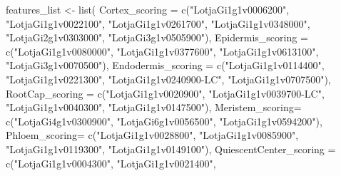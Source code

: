 \documentclass[
  letterpaper,
  DIV=11,
  numbers=noendperiod]{scrartcl}
\newenvironment{Shaded}{}{}
\newcommand{\FunctionTok}[1]{\textcolor[rgb]{0.02,0.16,0.49}{#1}}
\newcommand{\NormalTok}[1]{#1}
\newcommand{\OtherTok}[1]{\textcolor[rgb]{0.00,0.44,0.13}{#1}}
\newcommand{\StringTok}[1]{\textcolor[rgb]{0.25,0.44,0.63}{#1}}
\begin{document}
\begin{Shaded}
\begin{Highlighting}[]
\NormalTok{features\_list }\OtherTok{\textless{}{-}} \FunctionTok{list}\NormalTok{(}
    \StringTok{\textquotesingle{}Cortex\_scoring\textquotesingle{}} \OtherTok{=} \FunctionTok{c}\NormalTok{(}\StringTok{"LotjaGi1g1v0006200"}\NormalTok{,}
                 \StringTok{"LotjaGi1g1v0022100"}\NormalTok{,}
                 \StringTok{"LotjaGi1g1v0261700"}\NormalTok{,}
                 \StringTok{"LotjaGi1g1v0348000"}\NormalTok{,}
                 \StringTok{"LotjaGi2g1v0303000"}\NormalTok{,}
                 \StringTok{"LotjaGi3g1v0505900"}\NormalTok{),}
    \StringTok{\textquotesingle{}Epidermis\_scoring\textquotesingle{}} \OtherTok{=} \FunctionTok{c}\NormalTok{(}\StringTok{"LotjaGi1g1v0080000"}\NormalTok{,}
                    \StringTok{"LotjaGi1g1v0377600"}\NormalTok{,}
                    \StringTok{"LotjaGi1g1v0613100"}\NormalTok{,}
                    \StringTok{"LotjaGi3g1v0070500"}\NormalTok{),}
    \StringTok{\textquotesingle{}Endodermis\_scoring\textquotesingle{}} \OtherTok{=} \FunctionTok{c}\NormalTok{(}\StringTok{"LotjaGi1g1v0114400"}\NormalTok{,}
                     \StringTok{"LotjaGi1g1v0221300"}\NormalTok{,}
                     \StringTok{"LotjaGi1g1v0240900{-}LC"}\NormalTok{,}
                     \StringTok{"LotjaGi1g1v0707500"}\NormalTok{), }
    \StringTok{\textquotesingle{}RootCap\_scoring\textquotesingle{}} \OtherTok{=} \FunctionTok{c}\NormalTok{(}\StringTok{"LotjaGi1g1v0020900"}\NormalTok{,}
                   \StringTok{"LotjaGi1g1v0039700{-}LC"}\NormalTok{,}
                   \StringTok{"LotjaGi1g1v0040300"}\NormalTok{,}
                   \StringTok{"LotjaGi1g1v0147500"}\NormalTok{),  }
    \StringTok{\textquotesingle{}Meristem\_scoring\textquotesingle{}}\OtherTok{=} \FunctionTok{c}\NormalTok{(}\StringTok{"LotjaGi4g1v0300900"}\NormalTok{,}
                         \StringTok{"LotjaGi6g1v0056500"}\NormalTok{,}
                         \StringTok{"LotjaGi1g1v0594200"}\NormalTok{),}
    \StringTok{\textquotesingle{}Phloem\_scoring\textquotesingle{}}\OtherTok{=} \FunctionTok{c}\NormalTok{(}\StringTok{"LotjaGi1g1v0028800"}\NormalTok{,}
                \StringTok{"LotjaGi1g1v0085900"}\NormalTok{,}
                \StringTok{"LotjaGi1g1v0119300"}\NormalTok{,}
                \StringTok{"LotjaGi1g1v0149100"}\NormalTok{),}
    \StringTok{\textquotesingle{}QuiescentCenter\_scoring\textquotesingle{}} \OtherTok{=} \FunctionTok{c}\NormalTok{(}\StringTok{"LotjaGi1g1v0004300"}\NormalTok{,}
                           \StringTok{"LotjaGi1g1v0021400"}\NormalTok{,}

\end{Highlighting}
\end{Shaded}
\end{document}
